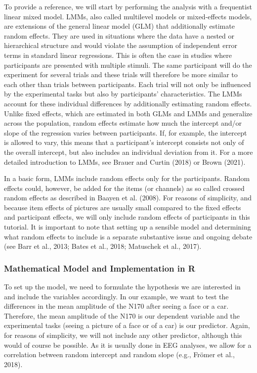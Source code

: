 \documentclass[
  doc,12pt,floatsintext]{apa7}
\begin{document}
To provide a reference, we will start by performing the analysis with a frequentist linear mixed model. LMMs, also called multilevel models or mixed-effects models, are extensions of the general linear model (GLM) that additionally estimate random effects. They are used in situations where the data have a nested or hierarchical structure and would violate the assumption of independent error terms in standard linear regressions. This is often the case in studies where participants are presented with multiple stimuli. The same participant will do the experiment for several trials and these trials will therefore be more similar to each other than trials between participants. Each trial will not only be influenced by the experimental tasks but also by participants' characteristics. The LMMs account for these individual differences by additionally estimating random effects. Unlike fixed effects, which are estimated in both GLMs and LMMs and generalize across the population, random effects estimate how much the intercept and/or slope of the regression varies between participants. If, for example, the intercept is allowed to vary, this means that a participant's intercept consists not only of the overall intercept, but also includes an individual deviation from it. For a more detailed introduction to LMMs, see Brauer and Curtin (2018) or Brown (2021).

In a basic form, LMMs include random effects only for the participants. Random effects could, however, be added for the items (or channels) as so called crossed random effects as described in Baayen et al. (2008). For reasons of simplicity, and because item effects of pictures are usually small compared to the fixed effects and participant effects, we will only include random effects of participants in this tutorial. It is important to note that setting up a sensible model and determining what random effects to include is a separate substantive issue and ongoing debate (see Barr et al., 2013; Bates et al., 2018; Matuschek et al., 2017).

\subsubsection{Mathematical Model and Implementation in R}\label{mathematical-model-and-implementation-in-r}

To set up the model, we need to formulate the hypothesis we are interested in and include the variables accordingly. In our example, we want to test the differences in the mean amplitude of the N170 after seeing a face or a car. Therefore, the mean amplitude of the N170 is our dependent variable and the experimental tasks (seeing a picture of a face or of a car) is our predictor. Again, for reasons of simplicity, we will not include any other predictor, although this would of course be possible. As it is usually done in EEG analyses, we allow for a correlation between random intercept and random slope (e.g., Frömer et al., 2018).
\end{document}
